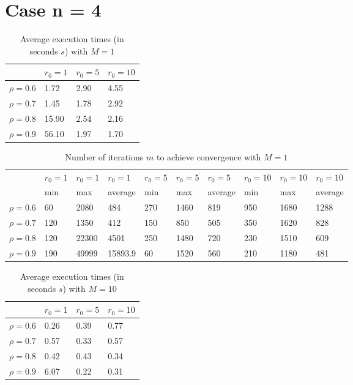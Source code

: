 \documentclass[a4paper,11pt,openright]{report}
\begin{document}
\section*{Case n = 4}  
\begin{table}[H]
\centering
\addtolength{\leftskip}{-1.5cm}
\addtolength{\rightskip}{-1.5cm}
\begin{tabular}{|c|lll|}
\hline
$ $ & $r_0 = 1$ & $r_0 = 5$ & $r_0 = 10$ \\
\hline
$\rho = 0.6$ & 1.72 & 2.90 & 4.55 \\

$\rho = 0.7$ & 1.45 & 1.78 & 2.92 \\

$\rho = 0.8$ & 15.90 & 2.54 & 2.16 \\

$\rho = 0.9$ & 56.10 & 1.97 & 1.70 \\
\hline
\end{tabular}
\caption{Average execution
 times (in seconds $s$) with $M = 1$}
\end{table}
\begin{table}[H]
\centering
\addtolength{\leftskip}{-1.5cm}
\addtolength{\rightskip}{-1.5cm}
\begin{tabular}{|c|lllllllll|}
\hline
$ $ & $r_0 = 1$ & $r_0 = 1$ & $r_0 = 1$ & $r_0 = 5$ & $r_0 = 5$ & $r_0 = 5$ & $r_0 = 10$ & $r_0 = 10$ & $r_0 = 10$  \\
$ $ & min & max & average & min & max & average & min & max & average \\ 
\hline
$\rho = 0.6$ & 60 & 2080 & 484 & 270 & 1460 & 819 & 950 & 1680 & 1288 \\

$\rho = 0.7$ & 120 & 1350 & 412 & 150 & 850 & 505 & 350 & 1620 & 828\\

$\rho = 0.8$ & 120 & 22300 & 4501 & 250 & 1480 & 720 & 230 & 1510 & 609\\

$\rho = 0.9$ & 190 & 49999 & 15893.9 & 60 & 1520 & 560 & 210 & 1180 & 481\\
\hline
\end{tabular}
\caption{Number of iterations $m$ to achieve convergence with $M = 1$}
\end{table}
\begin{table}[H]
\centering
\addtolength{\leftskip}{-1.5cm}
\addtolength{\rightskip}{-1.5cm}
\begin{tabular}{|c|lll|}
\hline
$ $ & $r_0 = 1$ & $r_0 = 5$ & $r_0 = 10$ \\
\hline
$\rho = 0.6$ & 0.26 & 0.39 & 0.77 \\

$\rho = 0.7$ & 0.57 & 0.33 & 0.57 \\

$\rho = 0.8$ & 0.42 & 0.43 & 0.34 \\

$\rho = 0.9$ & 6.07 & 0.22 & 0.31 \\
\hline
\end{tabular}
\caption{Average execution
 times (in seconds $s$) with $M = 10$}
\end{table}
\end{document}
